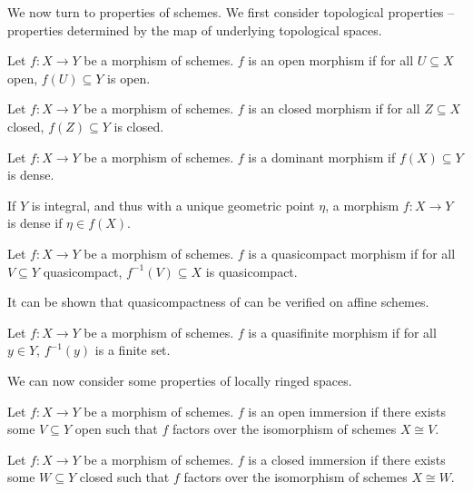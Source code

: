 We now turn to properties of schemes. We first consider topological properties -- properties determined by the map of underlying topological spaces. 
\begin{definition}\label{def: open morphism}
    Let $f:X\to Y$ be a morphism of schemes. $f$ is an open morphism if for all $U\subseteq X$ open, $f(U)\subseteq Y$ is open. 
\end{definition}
\begin{definition}\label{def: closed morphism}
    Let $f:X\to Y$ be a morphism of schemes. $f$ is an closed morphism if for all $Z\subseteq X$ closed, $f(Z)\subseteq Y$ is closed.
\end{definition}
\begin{definition}[Dominant]\label{def: dominant morphism}
    Let $f:X\to Y$ be a morphism of schemes. $f$ is a dominant morphism if $f(X)\subseteq Y$ is dense. 
\end{definition}
\begin{remark}
    If $Y$ is integral, and thus with a unique geometric point $\eta$, a morphism $f:X\to Y$ is dense if $\eta\in f(X)$. 
\end{remark}
\begin{definition}\label{def: quasicompact morphism}
    Let $f:X\to Y$ be a morphism of schemes. $f$ is a quasicompact morphism if for all $V\subseteq Y$ quasicompact, $f^{-1}(V)\subseteq X$ is quasicompact. 
\end{definition}
\begin{remark}
    It can be shown that quasicompactness of  can be verified on affine schemes. 
\end{remark}
\begin{definition}\label{def: quasifinite}
    Let $f:X\to Y$ be a morphism of schemes. $f$ is a quasifinite morphism if for all $y\in Y$, $f^{-1}(y)$ is a finite set. 
\end{definition}
We can now consider some properties of locally ringed spaces.
\begin{definition}\label{def: open immerrsion}
    Let $f:X\to Y$ be a morphism of schemes. $f$ is an open immersion if there exists some $V\subseteq Y$ open such that $f$ factors over the isomorphism of schemes $X\cong V$.  
\end{definition}
\begin{definition}\label{def: closed immersion}
    Let $f:X\to Y$ be a morphism of schemes. $f$ is a closed immersion if there exists some $W\subseteq Y$ closed such that $f$ factors over the isomorphism of schemes $X\cong W$. 
\end{definition}
